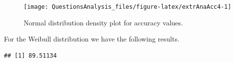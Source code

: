 \documentclass[
]{article}
\newenvironment{Shaded}{\begin{snugshade}}{\end{snugshade}}
\newcommand{\CommentTok}[1]{\textcolor[rgb]{0.56,0.35,0.01}{\textit{#1}}}
\newcommand{\DecValTok}[1]{\textcolor[rgb]{0.00,0.00,0.81}{#1}}
\newcommand{\FunctionTok}[1]{\textcolor[rgb]{0.00,0.00,0.00}{#1}}
\newcommand{\NormalTok}[1]{#1}
\newcommand{\OtherTok}[1]{\textcolor[rgb]{0.56,0.35,0.01}{#1}}
\newcommand{\SpecialCharTok}[1]{\textcolor[rgb]{0.00,0.00,0.00}{#1}}
\newcommand{\StringTok}[1]{\textcolor[rgb]{0.31,0.60,0.02}{#1}}
\begin{document}
\begin{figure}

{\centering \texttt{[image: QuestionsAnalysis\_files/figure-latex/extrAnaAcc4-1]} 

}

\caption{Normal distribution density plot for accuracy values.}\label{fig:extrAnaAcc4}
\end{figure}

For the Weibull distribution we have the following results.

\begin{Shaded}
\end{Shaded}

\begin{verbatim}
## [1] 89.51134
\end{verbatim}
\end{document}
